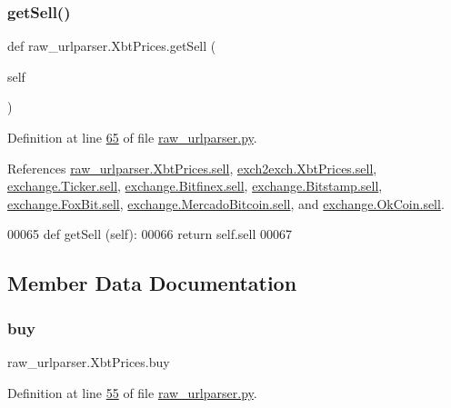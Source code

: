 \subsubsection{\texorpdfstring{get\+Sell()}{getSell()}}
{\footnotesize\ttfamily def raw\+\_\+urlparser.\+Xbt\+Prices.\+get\+Sell (\begin{DoxyParamCaption}\item[{}]{self }\end{DoxyParamCaption})}



Definition at line \hyperlink{raw__urlparser_8py_source_l00065}{65} of file \hyperlink{raw__urlparser_8py_source}{raw\+\_\+urlparser.\+py}.



References \hyperlink{raw__urlparser_8py_source_l00054}{raw\+\_\+urlparser.\+Xbt\+Prices.\+sell}, \hyperlink{exch2exch_8py_source_l00058}{exch2exch.\+Xbt\+Prices.\+sell}, \hyperlink{exchange_8py_source_l00061}{exchange.\+Ticker.\+sell}, \hyperlink{exchange_8py_source_l00431}{exchange.\+Bitfinex.\+sell}, \hyperlink{exchange_8py_source_l00503}{exchange.\+Bitstamp.\+sell}, \hyperlink{exchange_8py_source_l00575}{exchange.\+Fox\+Bit.\+sell}, \hyperlink{exchange_8py_source_l00643}{exchange.\+Mercado\+Bitcoin.\+sell}, and \hyperlink{exchange_8py_source_l00708}{exchange.\+Ok\+Coin.\+sell}.


\begin{DoxyCode}
00065     \textcolor{keyword}{def }getSell (self):
00066         \textcolor{keywordflow}{return} self.sell
00067         
\end{DoxyCode}


\subsection{Member Data Documentation}
\mbox{\label{classraw__urlparser_1_1_xbt_prices_a87eba659d6598ffd66c694535e1b7a7a}} 
\subsubsection{\texorpdfstring{buy}{buy}}
{\footnotesize\ttfamily raw\+\_\+urlparser.\+Xbt\+Prices.\+buy}



Definition at line \hyperlink{raw__urlparser_8py_source_l00055}{55} of file \hyperlink{raw__urlparser_8py_source}{raw\+\_\+urlparser.\+py}.



